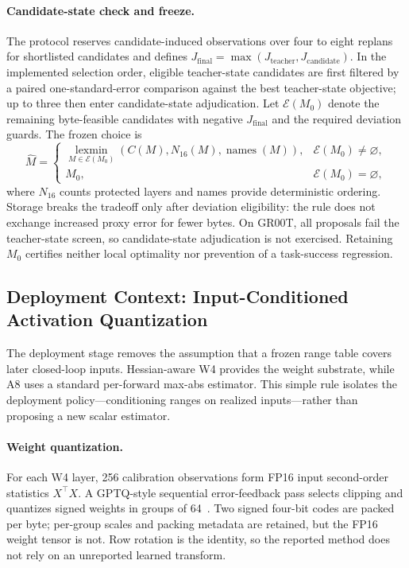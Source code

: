 \paragraph{Candidate-state check and freeze.}
The protocol reserves candidate-induced observations over four to eight replans for shortlisted candidates and defines $J_{\mathrm{final}}=\max(J_{\mathrm{teacher}},J_{\mathrm{candidate}})$. In the implemented selection order, eligible teacher-state candidates are first filtered by a paired one-standard-error comparison against the best teacher-state objective; up to three then enter candidate-state adjudication. Let $\mathcal E(M_0)$ denote the remaining byte-feasible candidates with negative $J_{\mathrm{final}}$ and the required deviation guards. The frozen choice is
\begin{equation}
\widehat M=\begin{cases}
\operatorname*{lexmin}_{M\in\mathcal E(M_0)}
 (C(M),N_{16}(M),\operatorname{names}(M)),&\mathcal E(M_0)\ne\varnothing,\\
M_0,&\mathcal E(M_0)=\varnothing,
\end{cases}
\label{eq:restricted_freeze}
\end{equation}
where $N_{16}$ counts protected layers and names provide deterministic ordering. Storage breaks the tradeoff only after deviation eligibility: the rule does not exchange increased proxy error for fewer bytes. On GR00T, all proposals fail the teacher-state screen, so candidate-state adjudication is not exercised. Retaining $M_0$ certifies neither local optimality nor prevention of a task-success regression.

\subsection{Deployment Context: Input-Conditioned Activation Quantization}
\label{sec:deployment}

The deployment stage removes the assumption that a frozen range table covers later closed-loop inputs. Hessian-aware W4 provides the weight substrate, while A8 uses a standard per-forward max-abs estimator. This simple rule isolates the deployment policy---conditioning ranges on realized inputs---rather than proposing a new scalar estimator.

\paragraph{Weight quantization.}
For each W4 layer, 256 calibration observations form FP16 input second-order statistics $X^\top X$. A GPTQ-style sequential error-feedback pass selects clipping and quantizes signed weights in groups of 64~\cite{frantar2022gptq}. Two signed four-bit codes are packed per byte; per-group scales and packing metadata are retained, but the FP16 weight tensor is not. Row rotation is the identity, so the reported method does not rely on an unreported learned transform.

